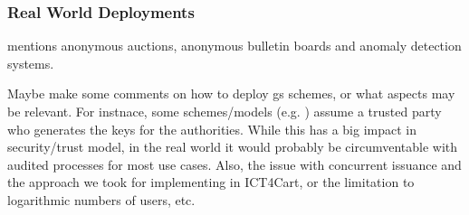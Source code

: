 \subsubsection{Real World Deployments}
\label{sssec:gsrwdeploy}


\cite{ehk+19} mentions anonymous auctions, anonymous bulletin boards and
anomaly detection systems.

Maybe make some comments on how to deploy gs schemes, or what aspects may be
relevant. For instnace, some schemes/models (e.g. \cite{ly12}) assume a
trusted party who generates the keys for the authorities. While this has
a big impact in security/trust model, in the real world it would probably
be circumventable with audited processes for most use cases. Also, the
issue with concurrent issuance and the approach we took for implementing
\cite{gl19} in ICT4Cart, or the limitation to logarithmic numbers of users, etc.

